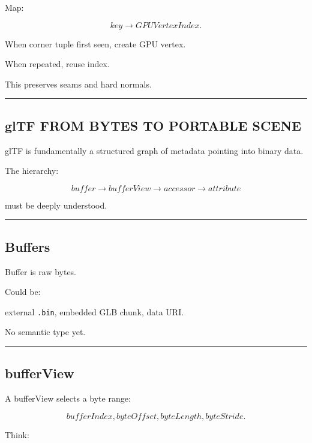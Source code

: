 Map:

\[
key\rightarrow GPUVertexIndex.
\]

When corner tuple first seen, create GPU vertex.

When repeated, reuse index.

This preserves seams and hard normals.

\begin{center}\rule{0.5\linewidth}{0.5pt}\end{center}

\subsection{glTF FROM BYTES TO PORTABLE SCENE}\label{04-visual-computing-ii-ch041-gltf-from-bytes-to-portable-scene}

glTF is fundamentally a structured graph of metadata pointing into binary data.

The hierarchy:

\[
\boxed{
buffer
\rightarrow
bufferView
\rightarrow
accessor
\rightarrow
attribute
}
\]

must be deeply understood.

\begin{center}\rule{0.5\linewidth}{0.5pt}\end{center}

\subsection{Buffers}\label{04-visual-computing-ii-ch041-buffers}

Buffer is raw bytes.

Could be:

external \texttt{.bin}, embedded GLB chunk, data URI.

No semantic type yet.

\begin{center}\rule{0.5\linewidth}{0.5pt}\end{center}

\subsection{bufferView}\label{04-visual-computing-ii-ch041-bufferview}

A bufferView selects a byte range:

\[
bufferIndex,
byteOffset,
byteLength,
byteStride.
\]

Think:

